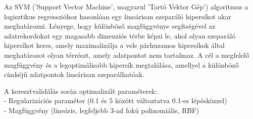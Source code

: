 \documentclass[12pt]{article}
\begin{document}
Az SVM ('Support Vector Machine', magyarul 'Tartó Vektor Gép') algoritmus a logisztikus regresszióhoz hasonlóan egy lineárisan szeparáló hipersíkot akar meghatározni. Lényege, hogy különböző magfüggvénye segítségével az adatrekordokat egy magasabb dimenziós térbe képzi le, ahol olyan szeparáló hipersíkot keres, amely maximalizálja a vele párhuzamos hipersíkok által meghatározot olyan térrészt, amely adatpontot nem tartalmaz. A cél a megfelelő magfüggvény és a legoptimálisabb hipersík megtalálása, amellyel a különböző címkéjű adatpontok lineárisan szeparálhatóak. 

A keresztvalidálás során optimalizált paraméterek: \\
- Regularizációs paraméter (0.1 és 5 között változtatva 0.1-es lépésközzel)\\
- Magfüggvény (lineáris, legfeljebb 3-ad fokú polinomiális, RBF)



%
%
%
\end{document}
